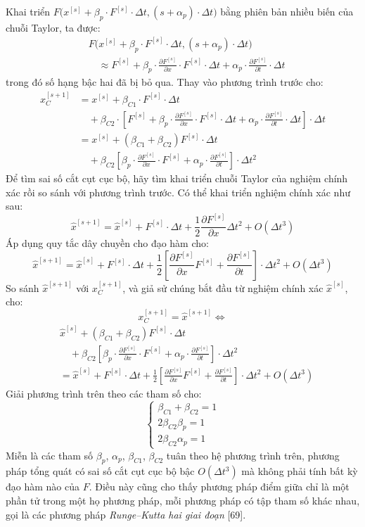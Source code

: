 Khai triển $F\bigl(x^{[s]}+\beta_p\cdot F^{[s]}\cdot\Delta t,(s+\alpha_p)\cdot\Delta t\bigr)$ bằng phiên bản nhiều biến của chuỗi Taylor, ta được:
\[\begin{aligned}
&F\bigl(x^{[s]}+\beta_p\cdot F^{[s]}\cdot\Delta t,(s+\alpha_p)\cdot\Delta t\bigr)\\
&\quad\approx F^{[s]}+\beta_p\cdot\frac{\partial F^{[s]}}{\partial x}\cdot F^{[s]}\cdot\Delta t+\alpha_p\cdot\frac{\partial F^{[s]}}{\partial t}\cdot\Delta t
\end{aligned}\]
trong đó số hạng bậc hai đã bị bỏ qua. Thay vào phương trình trước cho:
\[\begin{aligned}
x_C^{[s+1]}&=x^{[s]}+\beta_{C1}\cdot F^{[s]}\cdot\Delta t\\
&\quad+\beta_{C2}\cdot\left[F^{[s]}+\beta_p\cdot\frac{\partial F^{[s]}}{\partial x}\cdot F^{[s]}\cdot\Delta t+\alpha_p\cdot\frac{\partial F^{[s]}}{\partial t}\cdot\Delta t\right]\cdot\Delta t\\
&=x^{[s]}+(\beta_{C1}+\beta_{C2})F^{[s]}\cdot\Delta t\\
&\quad+\beta_{C2}\left[\beta_p\cdot\frac{\partial F^{[s]}}{\partial x}\cdot F^{[s]}+\alpha_p\cdot\frac{\partial F^{[s]}}{\partial t}\right]\cdot\Delta t^2
\end{aligned}\]
Để tìm sai số cắt cụt cục bộ, hãy tìm khai triển chuỗi Taylor của nghiệm chính xác rồi so sánh với phương trình trước. Có thể khai triển nghiệm chính xác như sau:
\[\hat x^{[s+1]}=\hat x^{[s]}+F^{[s]}\cdot\Delta t+\frac12\frac{\partial F^{[s]}}{\partial x}\Delta t^2+O(\Delta t^3)\]
Áp dụng quy tắc dây chuyền cho đạo hàm cho:
\[\hat x^{[s+1]}=\hat x^{[s]}+F^{[s]}\cdot\Delta t+\frac12\left[\frac{\partial F^{[s]}}{\partial x}F^{[s]}+\frac{\partial F^{[s]}}{\partial t}\right]\cdot\Delta t^2+O(\Delta t^3)\]
So sánh $\hat x^{[s+1]}$ với $x_C^{[s+1]}$, và giả sử chúng bắt đầu từ nghiệm chính xác $\hat x^{[s]}$, cho:
\[x_C^{[s+1]}=\hat x^{[s+1]}\Longleftrightarrow\]
\[\begin{aligned}
&\hat x^{[s]}+(\beta_{C1}+\beta_{C2})F^{[s]}\cdot\Delta t\\
&\quad+\beta_{C2}\left[\beta_p\cdot\frac{\partial F^{[s]}}{\partial x}\cdot F^{[s]}+\alpha_p\cdot\frac{\partial F^{[s]}}{\partial t}\right]\cdot\Delta t^2\\
&=\hat x^{[s]}+F^{[s]}\cdot\Delta t+\frac12\left[\frac{\partial F^{[s]}}{\partial x}F^{[s]}+\frac{\partial F^{[s]}}{\partial t}\right]\cdot\Delta t^2+O(\Delta t^3)
\end{aligned}\]
Giải phương trình trên theo các tham số cho:
\[\begin{cases}\beta_{C1}+\beta_{C2}=1\\2\beta_{C2}\beta_p=1\\2\beta_{C2}\alpha_p=1\end{cases}\]
Miễn là các tham số $\beta_p$, $\alpha_p$, $\beta_{C1}$, $\beta_{C2}$ tuân theo hệ phương trình trên, phương pháp tổng quát có sai số cắt cụt cục bộ bậc $O(\Delta t^3)$ mà không phải tính bất kỳ đạo hàm nào của $F$. Điều này cũng cho thấy phương pháp điểm giữa chỉ là một phần tử trong một họ phương pháp, mỗi phương pháp có tập tham số khác nhau, gọi là các phương pháp \emph{Runge--Kutta hai giai đoạn} [69].

